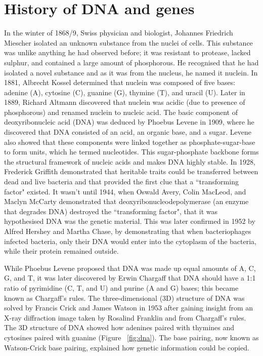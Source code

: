 \section{History of DNA and genes}

In the winter of 1868/9, Swiss physician and biologist, Johannes Friedrich Miescher isolated an unknown substance from the nuclei of cells\cite{dahm2008discovering}. This substance was unlike anything he had observed before; it was resistant to protease, lacked sulphur, and contained a large amount of phosphorous. He recognised that he had isolated a novel substance and as it was from the nucleus, he named it nuclein. In 1881, Albrecht Kossel determined that nuclein was composed of five bases: adenine (A), cytosine (C), guanine (G), thymine (T), and uracil (U). Later in 1889, Richard Altmann discovered that nuclein was acidic (due to presence of phosphorous) and renamed nuclein to nucleic acid. The basic component of deoxyribonucleic acid (DNA) was deduced by Phoebus Levene in 1909, where he discovered that DNA consisted of an acid, an organic base, and a sugar. Levene also showed that these components were linked together as phosphate-sugar-base to form units, which he termed nucleotides. This sugar-phosphate backbone forms the structural framework of nucleic acids and makes DNA highly stable. In 1928, Frederick Griffith demonstrated that heritable traits could be transferred between dead and live bacteria and that provided the first clue that a ``transforming factor" existed\cite{griffith1928significance}. It wasn't until 1944, when Oswald Avery, Colin MacLeod, and Maclyn McCarty demonstrated that deoxyribonucleodepolymerase (an enzyme that degrades DNA) destroyed the ``transforming factor", that it was hypothesised DNA was the genetic material\cite{avery1944studies}. This was later confirmed in 1952 by Alfred Hershey and Martha Chase, by demonstrating that when bacteriophages infected bacteria, only their DNA would enter into the cytoplasm of the bacteria, while their protein remained outside\cite{hershey1952independent}.

While Phoebus Levene proposed that DNA was made up equal amounts of A, C, G, and T, it was later discovered by Erwin Chargaff that DNA should have a 1:1 ratio of pyrimidine (C, T, and U) and purine (A and G) bases\cite{pmid14938364, pmid14945441}; this became known as Chargaff's rules. The three-dimensional (3D) structure of DNA was solved by Francis Crick and James Watson in 1953\cite{WATSON_1953} after gaining insight from an X-ray diffraction image taken by Rosalind Franklin and from Chargaff's rules. The 3D structure of DNA showed how adenines paired with thymines and cytosines paired with guanine (Figure ~\ref{fig:dna}). The base pairing, now known as Watson-Crick base pairing, explained how genetic information could be copied.

